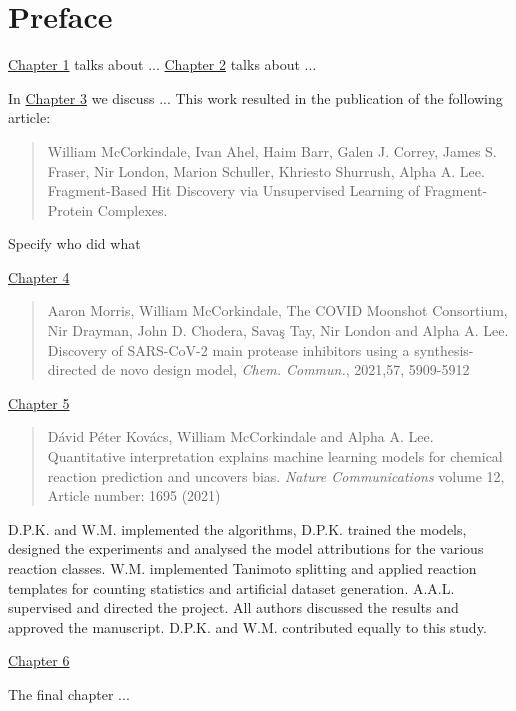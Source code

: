 \chapter*{Preface}
\hyperref[ch:intro]{Chapter 1} talks about ...
\hyperref[ch:background]{Chapter 2} talks about ...

In \hyperref[ch:fresco]{Chapter 3} we discuss ... This work resulted in the publication of the following article:
\begin{quote}
William McCorkindale, Ivan Ahel, Haim Barr, Galen J. Correy, James S. Fraser, Nir London, Marion Schuller, Khriesto Shurrush, Alpha A. Lee. Fragment-Based Hit Discovery via Unsupervised Learning of Fragment-Protein Complexes.
\end{quote}
Specify who did what

\hyperref[ch:ranking]{Chapter 4}
\begin{quote}
Aaron Morris, William McCorkindale, The COVID Moonshot Consortium, Nir Drayman, John D. Chodera, Savaş Tay, Nir London and Alpha A. Lee. Discovery of SARS-CoV-2 main protease inhibitors using a synthesis-directed de novo design model, \textit{Chem. Commun.}, 2021,57, 5909-5912 
\end{quote}

\hyperref[ch:transformer]{Chapter 5}
\begin{quote}
Dávid Péter Kovács, William McCorkindale and Alpha A. Lee. Quantitative interpretation explains machine learning models for chemical reaction prediction and uncovers bias. \textit{Nature Communications} volume 12, Article number: 1695 (2021)
\end{quote}

D.P.K. and W.M. implemented the algorithms, D.P.K. trained the models, designed the experiments and analysed the model attributions for the various reaction classes. W.M. implemented Tanimoto splitting and applied reaction templates for counting statistics and artificial dataset generation. A.A.L. supervised and directed the project. All authors discussed the results and approved the manuscript. D.P.K. and W.M. contributed equally to this study.

\hyperref[ch:testing]{Chapter 6}

The final chapter ...